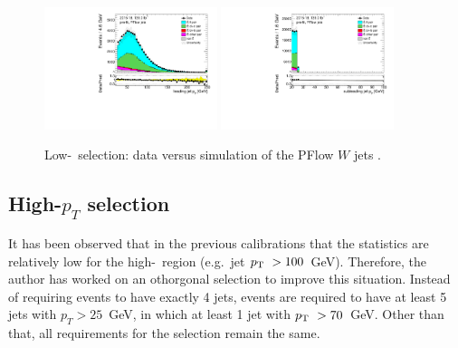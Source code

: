 \begin{figure}[H]
	\centering
	\includegraphics[width=0.45\textwidth]{FTAG_plots/pretagNoRwLowpTPFlowall/DataMC_h_J0_pt.pdf}
	\includegraphics[width=0.45\textwidth]{FTAG_plots/pretagNoRwLowpTPFlowall/DataMC_h_J1_pt.pdf}\\
	\caption{Low-\pt\ selection: data versus simulation of the 
	PFlow $W$ jets \pt. }
	\label{fig:kinematic_distributions_lowpT}
\end{figure}


\subsection{High-$p_T$ selection}
\label{high_pt_selection}
It has been observed that in the previous calibrations that the statistics 
are relatively low for the high-\pt\ region (e.g.\ jet $p_{\mathrm T}\ > 100$~GeV). 
Therefore, the author has worked on an othorgonal selection to improve this situation.
Instead of requiring events to have exactly 4 jets, events are required to 
have at least 5 jets with $p_{T} > 25$~GeV, in which at least 
1 jet with $p_{\mathrm T}\ > 70$~GeV. Other than that, all 
requirements for the selection remain the same. 


